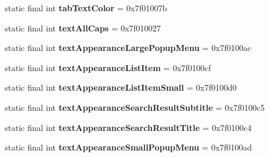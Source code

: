 \begin{DoxyCompactItemize}
\item 
\hypertarget{classandroid_1_1support_1_1design_1_1_r_1_1attr_a208aa1427a7eeaee81f9154016d528d7}{}static final int {\bfseries tab\+Text\+Color} = 0x7f01007b\label{classandroid_1_1support_1_1design_1_1_r_1_1attr_a208aa1427a7eeaee81f9154016d528d7}

\item 
\hypertarget{classandroid_1_1support_1_1design_1_1_r_1_1attr_ab755ba74b4f994f36ce6d0a4644b696a}{}static final int {\bfseries text\+All\+Caps} = 0x7f010027\label{classandroid_1_1support_1_1design_1_1_r_1_1attr_ab755ba74b4f994f36ce6d0a4644b696a}

\item 
\hypertarget{classandroid_1_1support_1_1design_1_1_r_1_1attr_a6a1db4cc00a586f8355a39fb984dfdca}{}static final int {\bfseries text\+Appearance\+Large\+Popup\+Menu} = 0x7f0100ac\label{classandroid_1_1support_1_1design_1_1_r_1_1attr_a6a1db4cc00a586f8355a39fb984dfdca}

\item 
\hypertarget{classandroid_1_1support_1_1design_1_1_r_1_1attr_adb54fe09750c1f317ebcb76f3581535a}{}static final int {\bfseries text\+Appearance\+List\+Item} = 0x7f0100cf\label{classandroid_1_1support_1_1design_1_1_r_1_1attr_adb54fe09750c1f317ebcb76f3581535a}

\item 
\hypertarget{classandroid_1_1support_1_1design_1_1_r_1_1attr_a88255c007925fe926ee195f8ecd9102c}{}static final int {\bfseries text\+Appearance\+List\+Item\+Small} = 0x7f0100d0\label{classandroid_1_1support_1_1design_1_1_r_1_1attr_a88255c007925fe926ee195f8ecd9102c}

\item 
\hypertarget{classandroid_1_1support_1_1design_1_1_r_1_1attr_a589eba96297a5cbf1c44b17b52462d47}{}static final int {\bfseries text\+Appearance\+Search\+Result\+Subtitle} = 0x7f0100c5\label{classandroid_1_1support_1_1design_1_1_r_1_1attr_a589eba96297a5cbf1c44b17b52462d47}

\item 
\hypertarget{classandroid_1_1support_1_1design_1_1_r_1_1attr_adfd41707242fb4edba11e3532b4e0e0c}{}static final int {\bfseries text\+Appearance\+Search\+Result\+Title} = 0x7f0100c4\label{classandroid_1_1support_1_1design_1_1_r_1_1attr_adfd41707242fb4edba11e3532b4e0e0c}

\item 
\hypertarget{classandroid_1_1support_1_1design_1_1_r_1_1attr_a0456fca18bac043ad1ac869f567a37d2}{}static final int {\bfseries text\+Appearance\+Small\+Popup\+Menu} = 0x7f0100ad\label{classandroid_1_1support_1_1design_1_1_r_1_1attr_a0456fca18bac043ad1ac869f567a37d2}


\end{DoxyCompactItemize}
